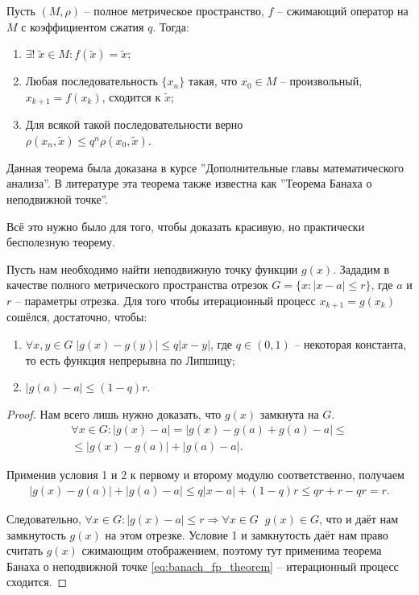\documentclass[../main.tex]{subfile}
\begin{document}
\begin{theorem}\label{eq:banach_fp_theorem}
	Пусть $(M,\rho)$ -- полное метрическое пространство, $f$ -- сжимающий
	оператор на $M$ с коэффициентом сжатия $q$. Тогда:
	\begin{enumerate}
		\item $\exists!\;\widetilde{x}\in M: f(\widetilde{x})=\widetilde{x}$;
		\item Любая последовательность $\{x_n\}$ такая, что $x_0 \in M$ --
			произвольный, $x_{k+1}=f(x_k)$, сходится к $\widetilde{x}$;
		\item Для всякой такой последовательности верно\\
			$\rho(x_n, \widetilde{x}) \le q ^ n \rho(x_0, \widetilde{x})$.
	\end{enumerate}
\end{theorem}

Данная теорема была доказана в курсе ''Дополнительные главы математического
анализа''. В литературе эта теорема также известна как ''Теорема Банаха о
неподвижной точке''.

Всё это нужно было для того, чтобы доказать красивую, но практически бесполезную
теорему.

\begin{theorem}
	Пусть нам необходимо найти неподвижную точку функции $g(x)$. Зададим
	в качестве полного метрического пространства отрезок $G=\{x: |x-a| \le r\}$,
	где $a$ и $r$ -- параметры отрезка. Для того чтобы итерационный процесс
	$x_{k+1}=g(x_k)$ сошёлся, достаточно, чтобы:
	\begin{enumerate}
		\item $\forall x,y\in G\;|g(x)-g(y)|\le q|x-y|$, где $q\in(0,1)$ --
			некоторая константа, то есть функция непрерывна по Липшицу;
		\item $|g(a)-a|\le(1-q)r$.
	\end{enumerate}
\end{theorem}
\newpage

\begin{proof}
	Нам всего лишь нужно доказать, что $g(x)$ замкнута на $G$.
	\begin{multline*}
		\forall x\in G:|g(x)-a|=|g(x)-g(a)+g(a)-a|\le \\
		\le|g(x)-g(a)|+|g(a)-a|.
	\end{multline*}

	Применив условия 1 и 2 к первому и второму модулю соответственно, получаем
	\begin{align*}
		|g(x)-g(a)|+|g(a)-a|\le q|x-a|+(1-q)r\le qr+r-qr=r.
	\end{align*}

	Следовательно, $\forall x\in G: |g(x)-a|\le r\Rightarrow\forall x\in
	G\;\;g(x)\in G$, что и даёт нам замкнутость $g(x)$ на этом отрезке.
	Условие 1 и замкнутость даёт нам право считать $g(x)$ сжимающим
	отображением, поэтому тут применима теорема Банаха о неподвижной точке
	\eqref{eq:banach_fp_theorem} -- итерационный процесс сходится.
\end{proof}
\end{document}
